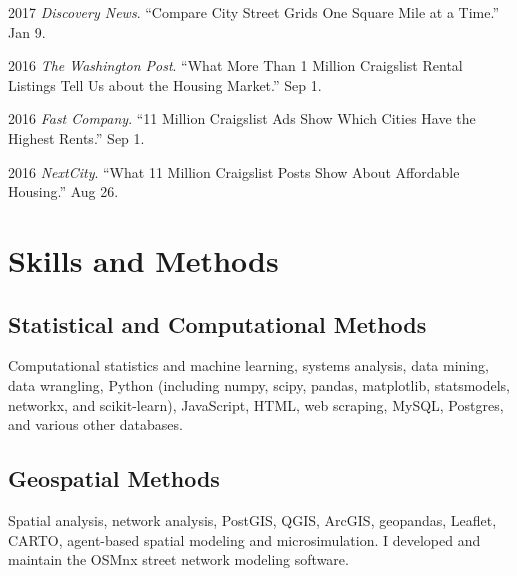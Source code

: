 \documentclass[12pt,letterpaper]{report}
\newcommand{\listitemspace}{0.15em}
\renewenvironment{itemize}
{\begin{list}{}{\setlength{\leftmargin}{0em}
				\setlength{\parskip}{0em}
				\setlength{\itemsep}{\listitemspace}
				\setlength{\parsep}{\listitemspace}}}
{\end{list}}
\begin{document}
\begin{tablist}
\item 2017 \tab \textit{Discovery News}. \enquote{Compare City Street Grids One Square Mile at a Time.} Jan 9.

\item 2016 \tab \textit{The Washington Post}. \enquote{What More Than 1 Million Craigslist Rental Listings Tell Us about the Housing Market.} Sep 1.

\item 2016 \tab \textit{Fast Company}. \enquote{11 Million Craigslist Ads Show Which Cities Have the Highest Rents.} Sep 1.

\item 2016 \tab \textit{NextCity}. \enquote{What 11 Million Craigslist Posts Show About Affordable Housing.} Aug 26.

\end{tablist}



\section*{Skills and Methods}

\subsection*{Statistical and Computational Methods}

\begin{itemize}
	
\item Computational statistics and machine learning, systems analysis, data mining, data wrangling, Python (including numpy, scipy, pandas, matplotlib, statsmodels, networkx, and scikit-learn), JavaScript, HTML, web scraping, MySQL, Postgres, and various other databases.

\end{itemize}

\subsection*{Geospatial Methods}

\begin{itemize}

\item Spatial analysis, network analysis, PostGIS, QGIS, ArcGIS, geopandas, Leaflet, CARTO, agent-based spatial modeling and microsimulation. I developed and maintain the OSMnx street network modeling software.

\end{itemize}
\end{document}
